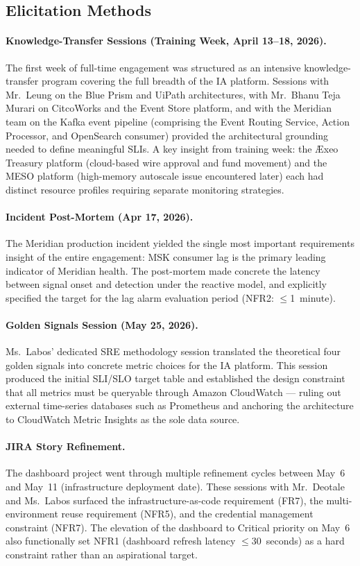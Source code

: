 \subsection{Elicitation Methods}

\paragraph{Knowledge-Transfer Sessions (Training Week, April 13--18, 2026).}
The first week of full-time engagement was structured as an intensive
knowledge-transfer program covering the full breadth of the IA
platform. Sessions with Mr.\ Leung on the Blue Prism and UiPath
architectures, with Mr.\ Bhanu Teja Murari on CitcoWorks and the Event Store
platform, and with the Meridian team on the Kafka event pipeline
(comprising the Event Routing Service, Action Processor, and OpenSearch
consumer) provided the architectural grounding needed to define
meaningful SLIs. A key insight from training week: the
\AE xeo Treasury platform (cloud-based wire approval and fund movement)
and the MESO platform (high-memory autoscale issue encountered later) each
had distinct resource profiles requiring separate monitoring strategies.

\paragraph{Incident Post-Mortem (Apr 17, 2026).}
The Meridian production incident yielded the single most important
requirements insight of the entire engagement: MSK consumer
lag is the primary leading indicator of Meridian health. The
post-mortem made concrete the latency between signal onset and
detection under the reactive model, and explicitly specified the target
for the lag alarm evaluation period (NFR2: $\leq$1~minute).

\paragraph{Golden Signals Session (May 25, 2026).}
Ms.\ Labos' dedicated SRE methodology session translated the theoretical
four golden signals into concrete metric choices for the IA platform.
This session produced the initial SLI/SLO target table and established
the design constraint that all metrics must be queryable through
Amazon CloudWatch --- ruling out external time-series databases such as
Prometheus and anchoring the architecture to CloudWatch Metric Insights
as the sole data source.

\paragraph{JIRA Story Refinement.}
The dashboard project went through multiple refinement cycles between May~6 and
May~11 (infrastructure deployment date). These sessions with Mr.\ Deotale
and Ms.\ Labos surfaced the infrastructure-as-code requirement (FR7), the
multi-environment reuse requirement (NFR5), and the credential
management constraint (NFR7). The elevation of the dashboard to Critical
priority on May~6 also functionally set NFR1 (dashboard refresh
latency $\leq$30~seconds) as a hard constraint rather than an aspirational
target.

